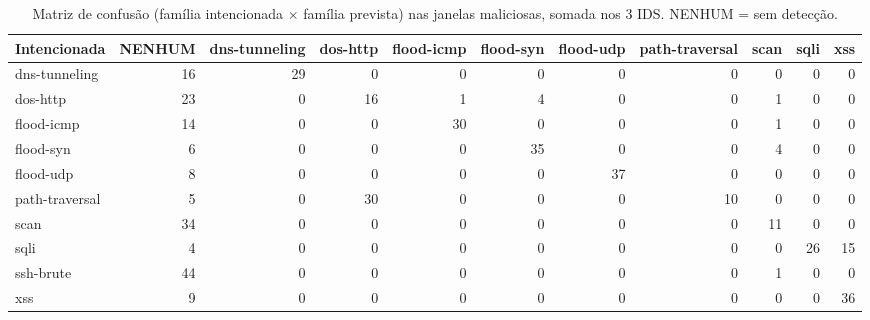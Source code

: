 \begin{table}[t]\centering
\caption{Matriz de confus\~ao (fam\'ilia intencionada $\times$ fam\'ilia prevista) nas janelas maliciosas, somada nos 3 IDS. NENHUM = sem detec\c{c}\~ao.}
\label{tab:confusao}
\footnotesize
\begin{tabular}{lrrrrrrrrrr}
\toprule
Intencionada & NENHUM & dns-tunneling & dos-http & flood-icmp & flood-syn & flood-udp & path-traversal & scan & sqli & xss \\
\midrule
dns-tunneling & 16 & 29 & 0 & 0 & 0 & 0 & 0 & 0 & 0 & 0 \\
dos-http & 23 & 0 & 16 & 1 & 4 & 0 & 0 & 1 & 0 & 0 \\
flood-icmp & 14 & 0 & 0 & 30 & 0 & 0 & 0 & 1 & 0 & 0 \\
flood-syn & 6 & 0 & 0 & 0 & 35 & 0 & 0 & 4 & 0 & 0 \\
flood-udp & 8 & 0 & 0 & 0 & 0 & 37 & 0 & 0 & 0 & 0 \\
path-traversal & 5 & 0 & 30 & 0 & 0 & 0 & 10 & 0 & 0 & 0 \\
scan & 34 & 0 & 0 & 0 & 0 & 0 & 0 & 11 & 0 & 0 \\
sqli & 4 & 0 & 0 & 0 & 0 & 0 & 0 & 0 & 26 & 15 \\
ssh-brute & 44 & 0 & 0 & 0 & 0 & 0 & 0 & 1 & 0 & 0 \\
xss & 9 & 0 & 0 & 0 & 0 & 0 & 0 & 0 & 0 & 36 \\
\bottomrule
\end{tabular}
\end{table}

